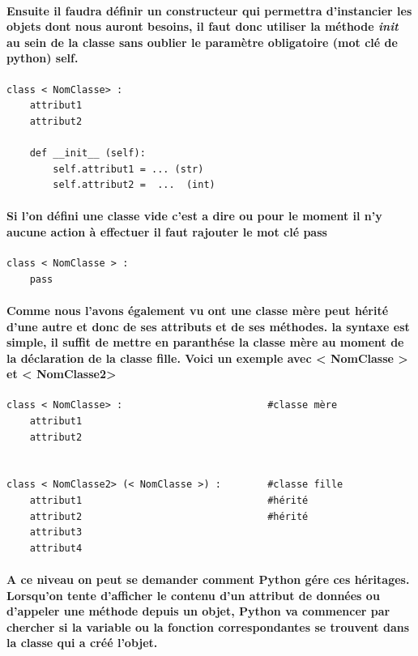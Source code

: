 \documentclass[a4paper, 12pt, twoside]{article}
\begin{document}
\paragraph{Ensuite il faudra définir un constructeur qui permettra d'instancier les objets dont nous auront besoins, il faut donc utiliser la méthode  \textit{init} au sein de la classe sans oublier le paramètre obligatoire (mot clé de python) self. }

\begin{verbatim}
class < NomClasse> : 
    attribut1
    attribut2 

    def __init__ (self):
        self.attribut1 = ... (str)
        self.attribut2 =  ...  (int)
\end{verbatim}
\paragraph{ Si l'on défini une classe vide c'est a dire ou pour le moment il n'y aucune action à effectuer il faut rajouter le mot clé pass}
\begin{verbatim}
class < NomClasse > : 
    pass 
\end{verbatim}

\paragraph{Comme nous l'avons également vu ont une classe mère peut hérité d'une autre et donc de ses attributs et de ses méthodes. la syntaxe est simple, il suffit de mettre en paranthése la classe mère au moment de la déclaration de la classe fille. Voici un exemple avec < NomClasse > et < NomClasse2>}
\begin{verbatim}
class < NomClasse> :                         #classe mère
    attribut1
    attribut2 


class < NomClasse2> (< NomClasse >) :        #classe fille
    attribut1                                #hérité 
    attribut2                                #hérité 
    attribut3   
    attribut4
\end{verbatim}
\paragraph{ A ce niveau on peut se demander comment Python gére ces héritages. Lorsqu’on tente d’afficher le contenu d’un attribut de données
ou d’appeler une méthode depuis un objet, Python va commencer par chercher si la variable ou la fonction correspondantes se trouvent dans la classe qui a créé l’objet.}
\end{document}
